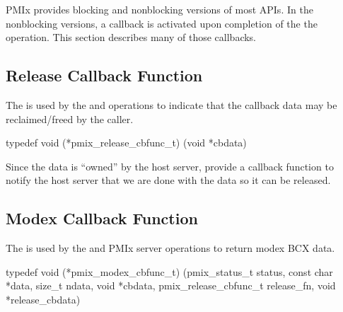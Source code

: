 PMIx provides blocking and nonblocking versions of most APIs.
In the nonblocking versions, a callback is activated upon completion of the the operation.
This section describes many of those callbacks.


\subsection{Release Callback Function}

\summary

The  is used by the  and  operations to indicate that the callback data may be reclaimed/freed by the caller.

\format

\cspecificstart
\begin{codepar}
typedef void (*pmix_release_cbfunc_t)
    (void *cbdata)
\end{codepar}
\cspecificend

\begin{arglist}
\end{arglist}

\descr

Since the data is ``owned'' by the host server, provide a callback function to notify the host server that we are done with the data so it can be released.


\subsection{Modex Callback Function}

\summary

The  is used by the  and  PMIx server operations to return modex \ac{BCX} data.

\cspecificstart
\begin{codepar}
typedef void (*pmix_modex_cbfunc_t)
    (pmix_status_t status,
     const char *data, size_t ndata,
     void *cbdata,
     pmix_release_cbfunc_t release_fn,
     void *release_cbdata)
\end{codepar}
\cspecificend

\begin{arglist}
\end{arglist}

